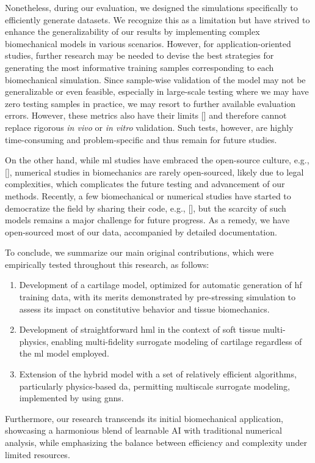 \documentclass[12pt,a4paper]{report}
\begin{document}
Nonetheless, during our evaluation, we designed the simulations specifically to efficiently generate datasets. We recognize this as a limitation but have strived to enhance the generalizability of our results by implementing complex biomechanical models in various scenarios. However, for application-oriented studies, further research may be needed to devise the best strategies for generating the most informative training samples corresponding to each biomechanical simulation. Since sample-wise validation of the model may not be generalizable or even feasible, especially in large-scale testing where we may have zero testing samples in practice, we may resort to further available evaluation errors. However, these metrics also have their limits [\cite{barocas2023}] and therefore cannot replace rigorous \textit{in vivo} or \textit{in vitro} validation. Such tests, however, are highly time-consuming and problem-specific and thus remain for future studies.

On the other hand, while \ac{ml} studies have embraced the open-source culture, e.g., [\cite{panfilov2019,desai2019,desai2021,thomas2021,panfilov2022}], numerical studies in biomechanics are rarely open-sourced, likely due to legal complexities, which complicates the future testing and advancement of our methods. Recently, a few biomechanical or numerical studies have started to democratize the field by sharing their code, e.g., [\cite{fehervary2020,maes2023,chokhandre2021}], but the scarcity of such models remains a major challenge for future progress. As a remedy, we have open-sourced most of our data, accompanied by detailed documentation.

To conclude, we summarize our main original contributions, which were empirically tested throughout this research, as follows:
%
\begin{enumerate}
    \item Development of a cartilage model, optimized for automatic generation of \ac{hf} training data, with its merits demonstrated by pre-stressing simulation to assess its impact on constitutive behavior and tissue biomechanics.
    \item Development of straightforward \ac{hml} in the context of soft tissue multi-physics, enabling multi-fidelity surrogate modeling of cartilage regardless of the \ac{ml} model employed.
    \item Extension of the hybrid model with a set of relatively efficient algorithms, particularly physics-based \ac{da}, permitting multiscale surrogate modeling, implemented by using \acp{gnn}.
\end{enumerate}
%
Furthermore, our research transcends its initial biomechanical application, showcasing a harmonious blend of learnable AI with traditional numerical analysis, while emphasizing the balance between efficiency and complexity under limited resources.
\end{document}

